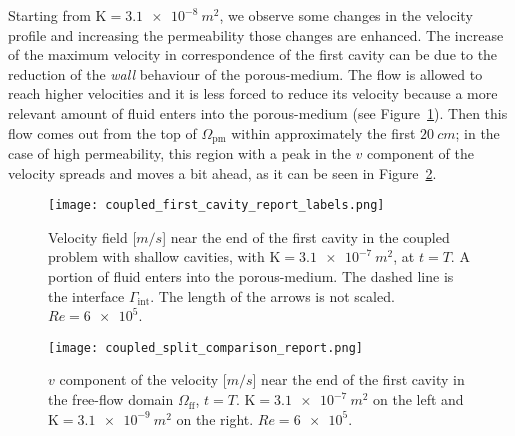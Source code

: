 Starting from $\mathrm{K}=\SI{3.1e-8}{m^2}$, we observe some changes in the velocity 
profile and increasing the permeability those changes are enhanced.
The increase of the maximum velocity in correspondence of the first cavity can 
be due to the reduction of the \emph{wall} behaviour of the porous-medium. The 
flow is allowed to reach higher velocities and it is less forced to reduce 
its velocity because a more relevant amount of fluid enters into the 
porous-medium (see Figure~\ref{fig:coupled_arrows}). Then this flow comes out 
from the top of $\Omega_\text{pm}$ within approximately the first 
$\SI{20}{cm}$; in the case of high permeability, this region with a peak in the 
$v$ component of the velocity spreads and 
moves a bit ahead, as it can be seen in Figure~\ref{fig:coupled_vel_split}.
\begin{figure}
	\centering
	\texttt{[image: coupled\_first\_cavity\_report\_labels.png]}
	\caption[Velocity field near the end of the first cavity in the coupled problem with shallow cavities]{Velocity field [$\si{m/s}$] near the end of the first cavity in the coupled problem with shallow cavities, with $\mathrm{K}=\SI{3.1e-7}{m^2}$, at $t=T$. A portion of fluid enters into the porous-medium. The dashed line is the interface $\Gamma_\text{int}$. The length of the arrows is not scaled. $Re=\num{6e5}$.}
	\label{fig:coupled_arrows}
\end{figure}
\begin{figure}
	\centering
	\texttt{[image: coupled\_split\_comparison\_report.png]}
	\caption[$v$ component of the velocity near the end of the first cavity in the coupled problem with shallow cavities]{$v$ component of the velocity [$\si{m/s}$] near the end of the first cavity in the free-flow domain $\Omega_\text{ff}$, $t=T$. $\mathrm{K} = \SI{3.1e-7}{m^2}$ on the left and $\mathrm{K} = \SI{3.1e-9}{m^2}$ on the right. $Re=\num{6e5}$.}
	\label{fig:coupled_vel_split}
\end{figure}


